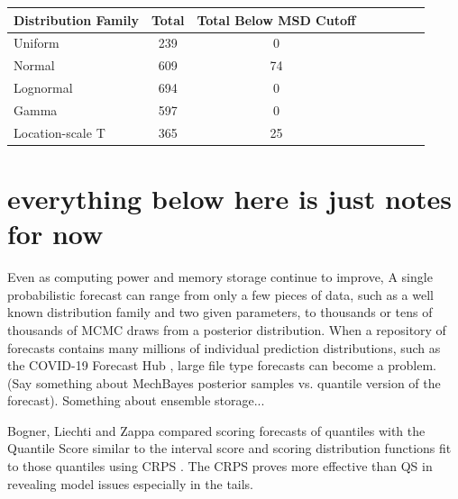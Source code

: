 \documentclass{article}\usepackage[]{graphicx}\usepackage[]{color}
\begin{document}
\begin{table}[h!]
  \centering
  \begin{tabular}{l*{6}{c}r}
  Distribution Family   & Total    & Total Below MSD Cutoff \\
  \hline
  Uniform               & 239      & 0        \\
  Normal                & 609      & 74       \\
  Lognormal             & 694      & 0        \\
  Gamma                 & 597      & 0        \\
  Location-scale T      & 365      & 25       \\
  \end{tabular}
\end{table}



















\newpage 

\section*{everything below here is just notes for now}


Even as computing power and memory storage continue to improve, 
A single probabilistic forecast can range from only a few pieces of data, such 
as a well known distribution family and two given parameters, to thousands or
tens of thousands of MCMC draws from a posterior distribution. When a repository
of forecasts contains many millions of individual prediction distributions, such
as the COVID-19 Forecast Hub \cite{Cramer2021-hub-dataset}, large file type forecasts can become a 
problem. (Say something about MechBayes posterior samples vs. quantile version
of the forecast).
Something about ensemble storage...





Bogner, Liechti and Zappa compared scoring forecasts of quantiles with the 
Quantile Score similar to the interval score and scoring distribution functions
fit to those quantiles using CRPS \cite{bogner2017combining}. 
The CRPS proves more effective than QS in 
revealing model issues especially in the tails.
\end{document}
